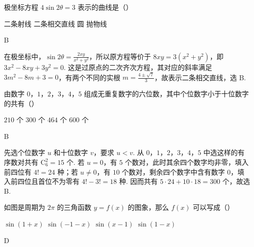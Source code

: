 \documentclass[UTF8,a4paper,oneside,11pt]{ctexbook}
\begin{document}
\begin{problem}
极坐标方程 \(4\sin 2\theta=3\) 表示的曲线是（\quad）

\choices
    {二条射线}
    {二条相交直线}
    {圆}
    {抛物线}

\end{problem}

\begin{answer}
B
\end{answer}

\begin{solution}
在极坐标中，\(\sin2\theta=\frac{2xy}{x^2+y^2}\)，所以原方程等价于 \(8xy=3(x^2+y^2)\)，即 \(3x^2-8xy+3y^2=0\). 这是过原点的二次齐次方程，其对应的斜率满足 \(3m^2-8m+3=0\)，有两个不同的实根 \(m=\frac{4\pm\sqrt{7}}{3}\)，故表示二条相交直线，选 B.
\end{solution}

\begin{problem}
由数字 \(0\)，\(1\)，\(2\)，\(3\)，\(4\)，\(5\) 组成无重复数字的六位数，其中个位数字小于十位数字的共有（\quad）

\choices
    {\(210\) 个}
    {\(300\) 个}
    {\(464\) 个}
    {\(600\) 个}

\end{problem}

\begin{answer}
B
\end{answer}

\begin{solution}
先选个位数字 \(u\) 和十位数字 \(v\)，要求 \(u<v\). 从 \(0\)，\(1\)，\(2\)，\(3\)，\(4\)，\(5\) 中选这样的有序数对共有 \(\mathrm C_6^2=15\) 个. 若 \(u=0\)，有 \(5\) 个数对，此时其余四个数字均非零，填入前四位有 \(4!=24\) 种；若 \(u\neq0\)，有 \(10\) 个数对，剩余四个数字中含有数字 \(0\)，填入前四位且首位不为零有 \(4!-3!=18\) 种. 因而共有 \(5\cdot24+10\cdot18=300\) 个，故选 B.
\end{solution}

\begin{problem}
如图是周期为 \(2\pi\) 的三角函数 \(y=f(x)\) 的图象，那么 \(f(x)\) 可以写成（\quad）


\choices
    {\(\sin(1+x)\)}
    {\(\sin(-1-x)\)}
    {\(\sin(x-1)\)}
    {\(\sin(1-x)\)}

\end{problem}

\begin{answer}
D
\end{answer}
\end{document}
